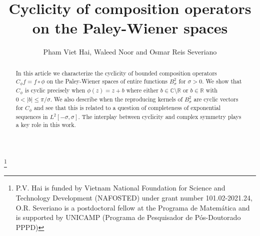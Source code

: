 \documentclass[11pt]{amsart}%
\numberwithin{equation}{section}
\theoremstyle{plain}
\theoremstyle{definition}
\theoremstyle{definition}
\begin{document}
\title[]{Cyclicity of composition operators on the Paley-Wiener spaces}
	
	
\author{Pham Viet Hai, Waleed Noor and Osmar Reis Severiano}%
\address[P. V. Hai]{Faculty of Mathematics and Informatics, Hanoi University of Science and Technology, Khoa Toan-Tin, Dai hoc Bach khoa Hanoi, 1 Dai Co Viet, Hanoi, Vietnam.}%
\address[W. Noor]{IMECC, Universidade Estadual de Campinas, Campinas-SP, Brazil}
\address [O. R. Severiano]{ IMECC, Universidade Estadual de Campinas, Campinas, Brazil}
\thanks{P.V. Hai is funded by Vietnam National Foundation for Science and Technology Development (NAFOSTED) under grant number 101.02-2021.24, O.R. Severiano is a postdoctoral fellow at the Programa de Matemática
and is supported by UNICAMP (Programa de Pesquisador de Pós-Doutorado PPPD) }
	
	
	
	
	
\begin{abstract} In this article we characterize the cyclicity of bounded composition operators $C_\phi f=f\circ \phi$ on the Paley-Wiener spaces of entire functions $B^2_\sigma$ for $\sigma>0$. We show that $C_\phi$ is cyclic precisely when $\phi(z)=z+b$ where either $b\in\mathbb{C}\setminus\mathbb{R}$ or $b\in\mathbb{R}$ with $0<|b|\leq \pi/\sigma$. We also describe when the reproducing kernels of $B^2_\sigma$ are cyclic vectors for $C_\phi$ and see that this is related to a question of completeness of exponential sequences in $L^2[-\sigma,\sigma]$. The interplay between cyclicity and complex symmetry plays a key role in this work.
\end{abstract}
	
\maketitle
	
	
	
\end{document}
